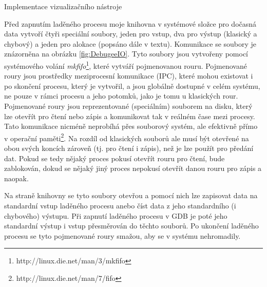 \documentclass[czech,bachelor,male,python,dept460]{diploma}						%
\newcommand{\parspace}[1][]{
	\ifthenelse{\isempty{#1}}{\vspace{5mm}}{\vspace{#1}}
	\par
}
\begin{document}
\begin{section}{Implementace vizualizačního nástroje}
			\parspace Před zapnutím laděného procesu moje knihovna v systémové složce pro dočasná data vytvoří čtyři speciální soubory, jeden pro vstup, dva pro výstup
			(klasický a chybový) a jeden pro alokace (popsáno dále v textu). Komunikace se soubory je znázorněna na obrázku \ref{fig:DebugeeIO}.
			Tyto soubory jsou vytvořeny pomocí systémového volání \textit{mkfifo}\footnote{http://linux.die.net/man/3/mkfifo}, které vytváří pojmenovanou rouru.
			Pojmenované roury jsou prostředky meziprocesní komunikace (IPC), které mohou existovat i po skončení procesu, který je vytvořil, a jsou globálně
			dostupné v celém systému, ne pouze v rámci procesu a jeho potomků, jako je tomu u klasických rour. Pojmenované roury jsou reprezentované (speciálním)
			souborem na disku, který lze otevřít pro čtení nebo zápis a komunikovat tak v reálném čase mezi procesy. Tato komunikace nicméně neprobíhá 
			přes souborový systém, ale efektivně přímo v operační paměti\footnote{http://linux.die.net/man/7/fifo}.
			Na rozdíl od klasických souborů ale musí být otevřené na obou svých koncích zároveň (tj. pro čtení i zápis), než je lze použít pro předání dat.
			Pokud se tedy nějaký proces pokusí otevřít rouru pro čtení, bude zablokován, dokud se nějaký jiný proces nepokusí otevřít danou
			rouru pro zápis a naopak.
			
			
			\parspace Na straně knihovny se tyto soubory otevřou a pomocí nich lze zapisovat data na standardní vstup laděného procesu anebo číst data z jeho
			standardního (i chybového) výstupu. Při zapnutí laděného procesu v GDB je poté jeho standardní výstup i vstup přesměrován do těchto souborů.
			Po ukončení laděného procesu se tyto pojmenované roury smažou, aby se v systému nehromadily.
			
			

\end{section}
\end{document}
